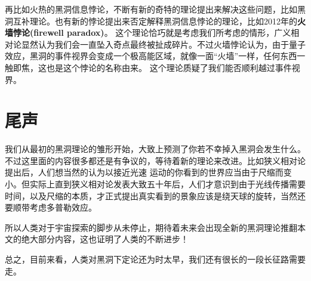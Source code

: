 \documentclass{ctexart}
\begin{document}
    再比如火热的黑洞信息悖论，不断有新的奇特的理论提出来解决这些问题，比如黑洞互补理论。也有新的悖论提出来否定解释黑洞信息悖论的理论，比如2012年的\textbf{火墙悖论(firewell paradox)}。\cite{almheiri2013black}
    这个理论恰巧就是考虑我们所考虑的情形，广义相对论显然认为我们会一直坠入奇点最终被扯成碎片。不过火墙悖论认为，由于量子效应，黑洞的事件视界会变成一个极高能区域，就像一面“火墙”一样，任何东西一触即焦，这也是这个悖论的名称由来。
    这个理论质疑了我们能否顺利越过事件视界。

    \section{尾声}
    我们从最初的黑洞理论的雏形开始，大致上预测了你若不幸掉入黑洞会发生什么。不过这里面的内容很多都还是有争议的，等待着新的理论来改进。比如狭义相对论提出后，人们想当然的认为以接近光速
    运动的你看到的世界应当由于尺缩而变小。但实际上直到狭义相对论发表大致五十年后，人们才意识到由于光线传播需要时间，以及尺缩的本质，才正式提出真实看到的景象应该是绕天球的旋转\cite{terrell1959invisibility}，当然还要顺带考虑多普勒效应。
    
    所以人类对于宇宙探索的脚步从未停止，期待着未来会出现全新的黑洞理论推翻本文的绝大部分内容，这也证明了人类的不断进步！
    
    总之，目前来看，人类对黑洞下定论还为时太早，我们还有很长的一段长征路需要走。

    \nocite{*}
    
    
\end{document}
